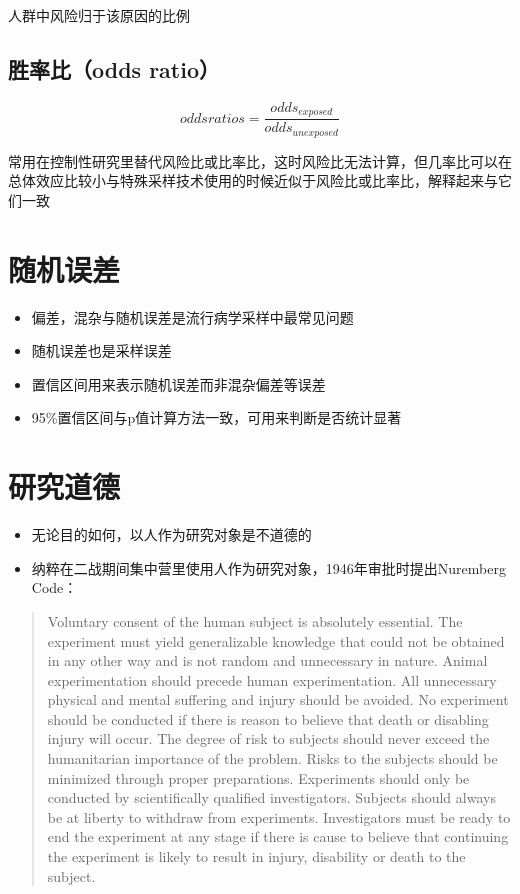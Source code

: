 \documentclass[]{book}
\providecommand{\tightlist}{%
  \setlength{\itemsep}{0pt}\setlength{\parskip}{0pt}}
\begin{document}
人群中风险归于该原因的比例

\hypertarget{ux80dcux7387ux6bd4odds-ratio}{%
\subsection{胜率比（odds ratio）}\label{ux80dcux7387ux6bd4odds-ratio}}

\[odds ratios = \frac{odds_{exposed}}{odds_{unexposed}}\]

常用在控制性研究里替代风险比或比率比，这时风险比无法计算，但几率比可以在总体效应比较小与特殊采样技术使用的时候近似于风险比或比率比，解释起来与它们一致

\hypertarget{ux968fux673aux8befux5dee}{%
\section{随机误差}\label{ux968fux673aux8befux5dee}}

\begin{itemize}
\tightlist
\item
  偏差，混杂与随机误差是流行病学采样中最常见问题
\item
  随机误差也是采样误差
\item
  置信区间用来表示随机误差而非混杂偏差等误差
\item
  95\%置信区间与p值计算方法一致，可用来判断是否统计显著
\end{itemize}

\hypertarget{ux7814ux7a76ux9053ux5fb7}{%
\section{研究道德}\label{ux7814ux7a76ux9053ux5fb7}}

\begin{itemize}
\tightlist
\item
  无论目的如何，以人作为研究对象是不道德的
\item
  纳粹在二战期间集中营里使用人作为研究对象，1946年审批时提出Nuremberg Code：
\end{itemize}

\begin{quote}
Voluntary consent of the human subject is absolutely essential.
The experiment must yield generalizable knowledge that could not be obtained in any other way and is not random and unnecessary in nature.
Animal experimentation should precede human experimentation.
All unnecessary physical and mental suffering and injury should be avoided.
No experiment should be conducted if there is reason to believe that death or disabling injury will occur.
The degree of risk to subjects should never exceed the humanitarian importance of the problem.
Risks to the subjects should be minimized through proper preparations.
Experiments should only be conducted by scientifically qualified investigators.
Subjects should always be at liberty to withdraw from experiments.
Investigators must be ready to end the experiment at any stage if there is cause to believe that continuing the experiment is likely to result in injury, disability or death to the subject.
\end{quote}
\end{document}
